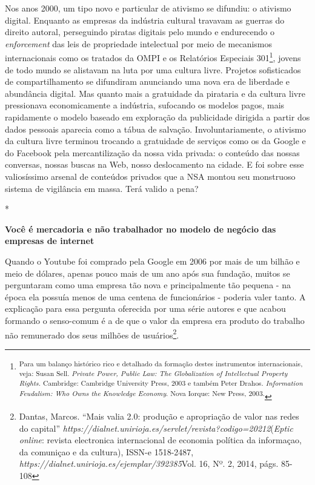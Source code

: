 Nos anos 2000, um tipo novo e particular de ativismo se difundiu: o
ativismo digital. Enquanto as empresas da indústria cultural travavam as
guerras do direito autoral, perseguindo piratas digitais pelo mundo e
endurecendo o \emph{enforcement} das leis de propriedade intelectual por
meio de mecanismos internacionais como os tratados da OMPI e os
Relatórios Especiais 301\footnote{\textsuperscript{Para um balanço
  histórico rico e detalhado da formação destes instrumentos
  internacionais, veja: Susan Sell. \emph{Private Power, Public Law: The
  Globalization of Intellectual Property Rights.} Cambridge: Cambridge
  University Press, 2003 e também Peter Drahos. \emph{Information
  Feudalism: Who Owns the Knowledge Economy}. Nova Iorque: New Press,
  2003.}}, jovens de todo mundo se alistavam na luta por uma cultura
livre. Projetos sofisticados de compartilhamento se difundiram
anunciando uma nova era de liberdade e abundância digital. Mas quanto
mais a gratuidade da pirataria e da cultura livre pressionava
economicamente a indústria, sufocando os modelos pagos, mais rapidamente
o modelo baseado em exploração da publicidade dirigida a partir dos
dados pessoais aparecia como a tábua de salvação. Involuntariamente, o
ativismo da cultura livre terminou trocando a gratuidade de serviços
como os da Google e do Facebook pela mercantilização da nossa vida
privada: o conteúdo das nossas conversas, nossas buscas na Web, nosso
deslocamento na cidade. E foi sobre esse valiosíssimo arsenal de
conteúdos privados que a NSA montou seu monstruoso sistema de vigilância
em massa. Terá valido a pena?

*

\textbf{Você é mercadoria e não trabalhador no modelo de negócio das
empresas de internet}

Quando o Youtube foi comprado pela Google em 2006 por mais de um bilhão
e meio de dólares, apenas pouco mais de um ano após sua fundação, muitos
se perguntaram como uma empresa tão nova e principalmente tão pequena -
na época ela possuía menos de uma centena de funcionários - poderia
valer tanto. A explicação para essa pergunta oferecida por uma série
autores e que acabou formando o senso-comum é a de que o valor da
empresa era produto do trabalho não remunerado dos seus milhões de
usuários\footnote{Dantas, Marcos. ``Mais valia 2.0:
  produção e apropriação de valor nas redes do capital''
  \emph{https://dialnet.unirioja.es/servlet/revista?codigo=20212}(\emph{Eptic
    online}: revista electronica internacional de economia política da
  informaçao, da comuniçao e da cultura), ISSN-e 1518-2487,
  \emph{https://dialnet.unirioja.es/ejemplar/392385}{{Vol. 16, Nº. 2,
  2014}}, págs. 85-108}.

